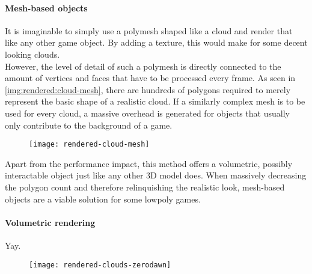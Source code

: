 \paragraph{Mesh-based objects}
It is imaginable to simply use a \gls{polymesh} shaped like a cloud and render that like any other game object. By adding a texture, this would make for some decent looking clouds.
\\
However, the level of detail of such a polymesh is directly connected to the amount of vertices and faces that have to be processed every frame.
As seen in \autoref{img:rendered:cloud-mesh}, there are hundreds of polygons required to merely represent the basic shape of a realistic cloud.
If a similarly complex mesh is to be used for every cloud, a massive overhead is generated for objects that usually only contribute to the background of a game.
\begin{figure}[H]
    \centering
    \texttt{[image: rendered-cloud-mesh]}
    \label{img:rendered:cloud-mesh}
\end{figure}
\noindent
Apart from the performance impact, this method offers a volumetric, possibly interactable object just like any other 3D model does.
When massively decreasing the polygon count and therefore relinquishing the realistic look, mesh-based objects are a viable solution for some \gls{lowpoly} games.

\paragraph{Volumetric rendering}
Yay.

\begin{figure}[H]
    \centering
    \texttt{[image: rendered-clouds-zerodawn]}
    \label{img:rendered:clouds-zerodawn}
\end{figure}